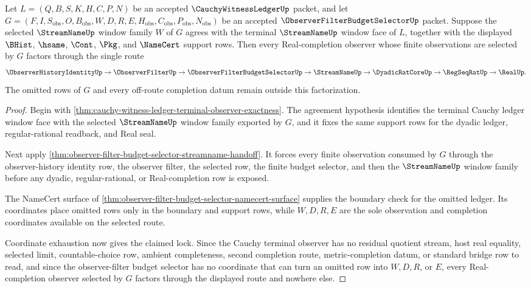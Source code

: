\begin{theorem}
\label{thm:cauchy-witness-ledger-observer-filter-budget-selector-lock}
Let $L=(Q,B,S,K,H,C,P,N)$ be an accepted $\CauchyWitnessLedgerUp$ packet, and let $G=(F,I,S_{\mathrm{obs}},O,B_{\mathrm{obs}},W,D,R,E,H_{\mathrm{obs}},C_{\mathrm{obs}},P_{\mathrm{obs}},N_{\mathrm{obs}})$ be an accepted $\ObserverFilterBudgetSelectorUp$ packet. Suppose the selected $\StreamNameUp$ window family $W$ of $G$ agrees with the terminal $\StreamNameUp$ window face of $L$, together with the displayed $\BHist$, $\hsame$, $\Cont$, $\Pkg$, and $\NameCert$ support rows. Then every Real-completion observer whose finite observations are selected by $G$ factors through the single route
$$
\ObserverHistoryIdentityUp \to
\ObserverFilterUp \to
\ObserverFilterBudgetSelectorUp \to
\StreamNameUp \to
\DyadicRatCoreUp \to
\RegSeqRatUp \to
\RealUp.
$$
The omitted rows of $G$ and every off-route completion datum remain outside this factorization.
\end{theorem}
\begin{proof}
Begin with \autoref{thm:cauchy-witness-ledger-terminal-observer-exactness}. The agreement hypothesis identifies the terminal Cauchy ledger window face with the selected $\StreamNameUp$ window family exported by $G$, and it fixes the same support rows for the dyadic ledger, regular-rational readback, and Real seal.

Next apply \autoref{thm:observer-filter-budget-selector-streamname-handoff}. It forces every finite observation consumed by $G$ through the observer-history identity row, the observer filter, the selected row, the finite budget selector, and then the $\StreamNameUp$ window family before any dyadic, regular-rational, or Real-completion row is exposed.

The NameCert surface of \autoref{thm:observer-filter-budget-selector-namecert-surface} supplies the boundary check for the omitted ledger. Its coordinates place omitted rows only in the boundary and support rows, while $W,D,R,E$ are the sole observation and completion coordinates available on the selected route.

Coordinate exhaustion now gives the claimed lock. Since the Cauchy terminal observer has no residual quotient stream, host real equality, selected limit, countable-choice row, ambient completeness, second completion route, metric-completion datum, or standard bridge row to read, and since the observer-filter budget selector has no coordinate that can turn an omitted row into $W,D,R$, or $E$, every Real-completion observer selected by $G$ factors through the displayed route and nowhere else.
\end{proof}

